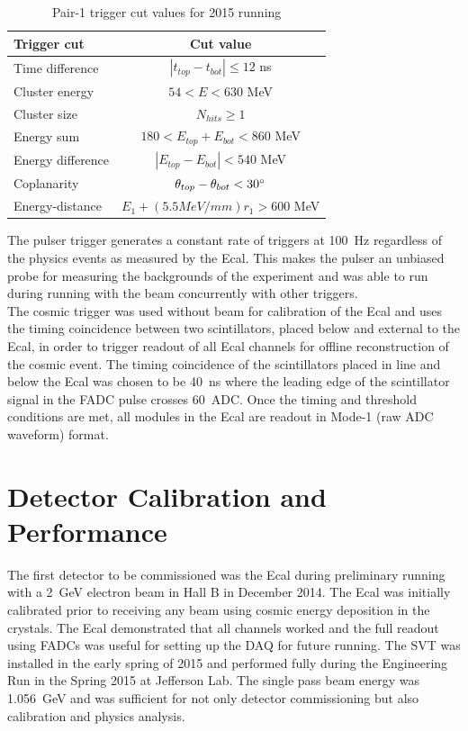 \documentclass[12pt]{report}
\begin{document}
\begin{table}[H]
\caption{Pair-1 trigger cut values for 2015 running}
\label{tab:pairTriggerVals}
\centering
\begin{tabular}{lc}
\toprule
Trigger cut & Cut value \\
\midrule
Time difference & $| t_{top}-t_{bot} | \leq12$ ns   \\
Cluster energy & $54<E<630$ MeV \\
Cluster size & $N_{hits}\geq 1$\\
Energy sum & $180<E_{top}+E_{bot}<860$ MeV\\
Energy difference & $| E_{top}-E_{bot}|<540$ MeV\\
Coplanarity & $\theta_{top}-\theta_{bot}<30\degree $\\
Energy-distance & $E_{1}+(5.5 MeV/mm)r_{1}>600$ MeV\\ 
\bottomrule
\end{tabular}
\end{table}

\indent The pulser trigger generates a constant rate of triggers at 100~Hz regardless of the physics events as measured by the Ecal. This makes the pulser an unbiased probe for measuring the backgrounds of the experiment and was able to run during running with the beam concurrently with other triggers.\\ 
\indent The cosmic trigger was used without beam for calibration of the Ecal and uses the timing coincidence between two scintillators, placed below and external to the Ecal, in order to trigger readout of all Ecal channels for offline reconstruction of the cosmic event. The timing coincidence of the scintillators placed in line and below the Ecal was chosen to be 40~ns where the leading edge of the scintillator signal in the FADC pulse crosses 60~ADC. Once the timing and threshold conditions are met, all modules in the Ecal are readout in Mode-1 (raw ADC waveform) format. 


\chapter{Detector Calibration and Performance} %

The first detector to be commissioned was the Ecal during preliminary running with a 2~GeV electron beam in Hall B in December 2014. The Ecal was initially calibrated prior to receiving any beam using cosmic energy deposition in the crystals. The Ecal demonstrated that all channels worked and the full readout using FADCs was useful for setting up the DAQ for future running. The SVT was installed in the early spring of 2015 and performed fully during the Engineering Run in the Spring 2015 at Jefferson Lab. The single pass beam energy was 1.056~GeV and was sufficient for not only detector commissioning but also calibration and physics analysis. 
\end{document}
